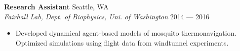 \documentclass[a4paper,12pt]{article}
\newcommand{\resheading}[1]{{\vspace*{.001in} \colorbox{mygrey}{\begin{minipage}{\textwidth}{\textmd{\large \textbf{#1} \vphantom{p\^{E}}}}\end{minipage}}} }
\newcommand{\ressubheading}[4]{
        \textbf{#1} \hfill #2\\
        \textit{#3} \hfill #4 \\}
\begin{document}

\ressubheading{Research Assistant}{Seattle, WA}{Fairhall Lab, Dept. of Biophysics, Uni. of Washington}{2014 --- 2016}
\begin{itemize}[noitemsep,topsep=0pt,parsep=0pt,partopsep=0pt, nolistsep] \vspace{-10pt}
\item Developed dynamical agent-based models of mosquito thermonavigation. Optimized simulations using flight data from windtunnel experiments.\\
\end{itemize}



%
%
%
%
\end{document}
